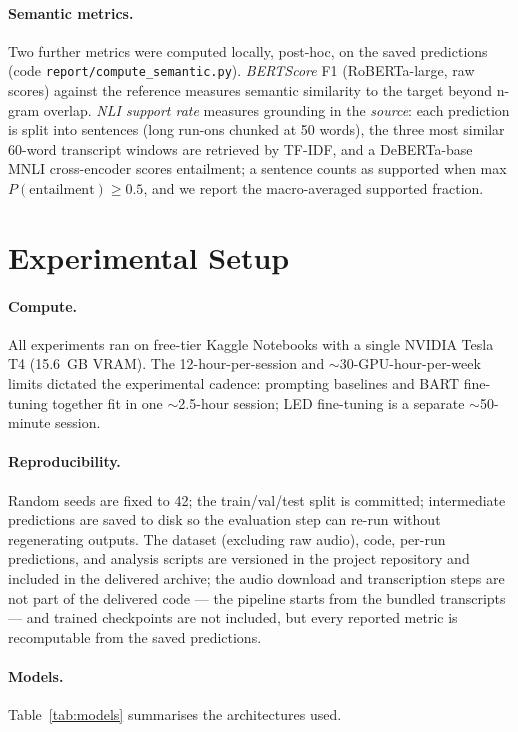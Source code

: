 \documentclass[10pt,a4paper]{article}
\begin{document}
\paragraph{Semantic metrics.}
Two further metrics were computed locally, post-hoc, on the saved predictions (code \texttt{report/compute\_semantic.py}). \emph{BERTScore} \citep{zhang2020bertscore} F1 (RoBERTa-large, raw scores) against the reference measures semantic similarity to the target beyond n-gram overlap. \emph{NLI support rate} measures grounding in the \emph{source}: each prediction is split into sentences (long run-ons chunked at 50 words), the three most similar 60-word transcript windows are retrieved by TF-IDF, and a DeBERTa-base MNLI cross-encoder scores entailment; a sentence counts as supported when max $P(\text{entailment}) \ge 0.5$, and we report the macro-averaged supported fraction.

\section{Experimental Setup}

\paragraph{Compute.} All experiments ran on free-tier Kaggle Notebooks with a single NVIDIA Tesla T4 (15.6~GB VRAM). The 12-hour-per-session and $\sim$30-GPU-hour-per-week limits dictated the experimental cadence: prompting baselines and BART fine-tuning together fit in one $\sim$2.5-hour session; LED fine-tuning is a separate $\sim$50-minute session.

\paragraph{Reproducibility.} Random seeds are fixed to 42; the train/val/test split is committed; intermediate predictions are saved to disk so the evaluation step can re-run without regenerating outputs. The dataset (excluding raw audio), code, per-run predictions, and analysis scripts are versioned in the project repository and included in the delivered archive; the audio download and transcription steps are not part of the delivered code --- the pipeline starts from the bundled transcripts --- and trained checkpoints are not included, but every reported metric is recomputable from the saved predictions.

\paragraph{Models.} Table~\ref{tab:models} summarises the architectures used.
\end{document}
